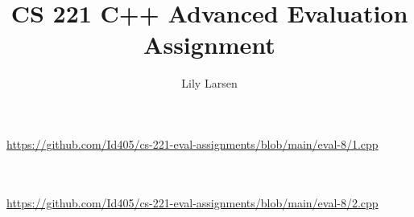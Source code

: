 \documentclass{article}
\title{CS 221 C++ Advanced Evaluation Assignment}
\author{Lily Larsen}
\newcommand{\nicecode}[2]{\inputminted[linenos=true,breaklines,fontsize=\small]{#1}{#2}}
\begin{document}
\maketitle
\newpage

\section{}
\vspace{2ex} \par
\url{https://github.com/Id405/cs-221-eval-assignments/blob/main/eval-8/1.cpp}
\nicecode{cpp}{1.cpp}
\newpage

\section{}
\vspace{2ex} \par
\url{https://github.com/Id405/cs-221-eval-assignments/blob/main/eval-8/2.cpp}
\nicecode{cpp}{2.cpp}
\newpage

\newpage
\end{document}
